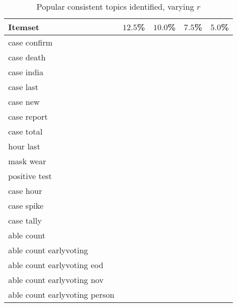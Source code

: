 
\begin{table}
    \centering
    \caption{Popular consistent topics identified, varying $r$}
    \label{tab:r}
    \begin{tabular}{>{\raggedright}p{}>{\raggedright}p{}p{}p{}p{}}
        \toprule
            Itemset
& $12.5$\small\%  & $10.0$\small\%  & $7.5$\small\%  & $5.0$\small\%   \\          
        \midrule
        case confirm & \checkC{} & \checkC{} & \checkC{} & \checkC{} \\
                case death & \checkC{} & \checkC{} & \checkC{} & \checkC{} \\
                case india & \checkC{} & \checkC{} & \checkC{} & \checkC{} \\
                case last & \checkC{} & \checkC{} & \checkC{} & \checkC{} \\
                case new & \checkC{} & \checkC{} & \checkC{} & \checkC{} \\
                case report & \checkC{} & \checkC{} & \checkC{} & \checkC{} \\
                case total & \checkC{} & \checkC{} & \checkC{} & \checkC{} \\
                hour last & \checkC{} & \checkC{} & \checkC{} & \checkC{} \\
                mask wear & \checkC{} & \checkC{} & \checkC{} & \checkC{} \\
                positive test & \checkC{} & \checkC{} & \checkC{} & \checkC{} \\
                case hour &        {} &        {} & \checkC{} & \checkC{} \\
                case spike &        {} &        {} & \checkC{} & \checkC{} \\
                case tally &        {} &        {} & \checkC{} & \checkC{} \\
                able count &        {} &        {} &        {} & \checkC{} \\
                able count earlyvoting &        {} &        {} &        {} & \checkC{} \\
                able count earlyvoting eod &        {} &        {} &        {} & \checkC{} \\
                able count earlyvoting nov &        {} &        {} &        {} & \checkC{} \\
                able count earlyvoting person &        {} &        {} &        {} & \checkC{} \\

\end{tabular}
\end{table}
